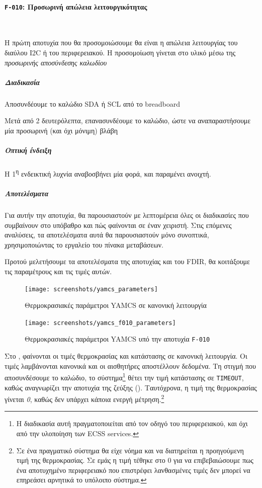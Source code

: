 \documentclass[a4paper,nobib]{tufte-book}
\begin{document}
\FloatBarrier

\paragraph{\textbf{\texttt{F-010}: Προσωρινή απώλεια λειτουργικότητας}}~

Η πρώτη αποτυχία που θα προσομοιώσουμε θα είναι η απώλεια λειτουργίας του διαύλου \acs{I2C} ή του περιφερειακού. Η προσομοίωση γίνεται στο υλικό μέσω της \emph{προσωρινής αποσύνδεσης καλωδίου}

\subparagraph{Διαδικασία} 
\begin{compactenum}
	\item Αποσυνδέουμε το καλώδιο \acs{SDA} ή \acs{SCL} από το breadboard
	\item Μετά από 2 δευτερόλεπτα, επανασυνδέουμε το καλώδιο, ώστε να αναπαραστήσουμε μία προσωρινή (και όχι μόνιμη) βλάβη
\end{compactenum}

\subparagraph{Οπτική ένδειξη} Η 1\textsuperscript{η} ενδεικτική λυχνία αναβοσβήνει μία φορά, και παραμένει ανοιχτή.

\subparagraph{Αποτελέσματα}
Για αυτήν την αποτυχία, θα παρουσιαστούν με λεπτομέρεια όλες οι διαδικασίες που συμβαίνουν στο υπόβαθρο και πώς φαίνονται σε έναν χειριστή. Στις επόμενες αναλύσεις, τα αποτελέσματα αυτά θα παρουσιαστούν μόνο συνοπτικά, χρησιμοποιώντας το εργαλείο του πίνακα μεταβάσεων.

Προτού μελετήσουμε τα αποτελέσματα της αποτυχίας και του \acs{FDIR}, θα κοιτάξουμε τις παραμέτρους και τις τιμές αυτών.

\begin{figure}[h]
	\centering
	\texttt{[image: screenshots/yamcs\_parameters]}
	\caption{Θερμοκρασιακές παράμετροι \acs{YAMCS} σε κανονική λειτουργία}
	\label{fig:yamcsparametersnominal}
\end{figure}

\begin{figure}[h]
	\centering
	\texttt{[image: screenshots/yamcs\_f010\_parameters]}
	\caption{Θερμοκρασιακές παράμετροι \acs{YAMCS} υπό την αποτυχία \texttt{F-010}}
	\label{fig:yamcsparametersf010}
\end{figure}

Στο , φαίνονται οι τιμές θερμοκρασίας και κατάστασης σε κανονική λειτουργία. Οι τιμές λαμβάνονται κανονικά και οι αισθητήρες αποστέλλουν δεδομένα. Τη στιγμή που αποσυνδέσουμε το καλώδιο, το σύστημα\footnote{Η διαδικασία αυτή πραγματοποιείται από τον οδηγό του περιφερειακού, και όχι από την υλοποίηση των \acs{ECSS} services.} θέτει την τιμή κατάστασης σε \texttt{TIMEOUT}, καθώς αναγνωρίζει την αποτυχία της ζεύξης (). Ταυτόχρονα, η τιμή της θερμοκρασίας γίνεται \emph{0}, καθώς δεν υπάρχει κάποια ενεργή μέτρηση.\footnote{Σε ένα πραγματικό σύστημα θα είχε νόημα και να διατηρείται η προηγούμενη τιμή της θερμοκρασίας. Σε εμάς η τιμή τέθηκε στο 0 για να επιβεβαιώσουμε πως ένα αποτυχημένο περιφερειακό που επιστρέφει λανθασμένες τιμές δεν μπορεί να επηρεάσει αρνητικά το υπόλοιπο σύστημα.}
\end{document}
